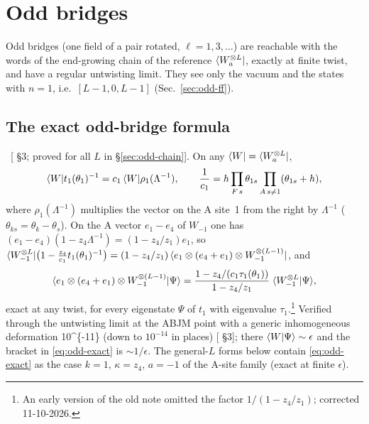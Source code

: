 \section{Odd bridges}\label{sec:odd}

Odd bridges (one field of a pair rotated, $\ell=1,3,\dots$) are reachable with the words of the end-growing chain of the
reference $\langle W_a^{\otimes L}|$, exactly at finite twist, and have a regular untwisting limit. They see only the vacuum and
the states with $n=1$, i.e.\ $[L-1,0,L-1]$ (Sec.~\ref{sec:odd-ff}).

\subsection{The exact odd-bridge formula}\label{sec:odd-exact}

\npy\ [ \S3; proved for all $L$ in \S\ref{sec:odd-chain}]. On any $\langle W|=\langle W_a^{\otimes L}|$,
\begin{equation}\label{eq:odd-c1}
 \langle W|t_1(\theta_1)^{-1}=c_1\,\langle W|\rho_1(\Lambda^{-1}),\qquad
 \frac1{c_1}=h\prod_{F\,s}\theta_{1s}\prod_{A\,s\ne1}(\theta_{1s}+h),
\end{equation}
where $\rho_1(\Lambda^{-1})$ multiplies the vector on the A site~1 from the right by $\Lambda^{-1}$ ($\theta_{ks}=\theta_k-\theta_s$).
On the A vector $e_1-e_4$ of $W_{-1}$ one has $(e_1-e_4)(1-z_4\Lambda^{-1})=(1-z_4/z_1)e_1$, so
$\langle W_{-1}^{\otimes L}|\big(1-\tfrac{z_4}{c_1}t_1(\theta_1)^{-1}\big)=(1-z_4/z_1)\,\langle e_1\otimes(e_4+e_1)\otimes W_{-1}^{\otimes(L-1)}|$, and
\begin{equation}\label{eq:odd-exact}
 \langle e_1\otimes(e_4+e_1)\otimes W_{-1}^{\otimes(L-1)}|\Psi\rangle=
 \frac{1-z_4/(c_1\tau_1(\theta_1))}{1-z_4/z_1}\;\langle W_{-1}^{\otimes L}|\Psi\rangle,
\end{equation}
exact at any twist, for every eigenstate $\Psi$ of $t_1$ with eigenvalue $\tau_1$.\footnote{An early version of the old note omitted
the factor $1/(1-z_4/z_1)$; corrected 11-10-2026.} Verified through the untwisting limit at the ABJM point with a generic
inhomogeneous deformation \num{10^{-11}} (down to $10^{-14}$ in places) [ \S3]; there $\langle W|\Psi\rangle\sim\epsilon$ and the
bracket in \eqref{eq:odd-exact} is $\sim1/\epsilon$. The general-$L$ forms below contain \eqref{eq:odd-exact} as the case
$k=1$, $\kappa=z_4$, $a=-1$ of the A-site family (exact at finite $\epsilon$).

